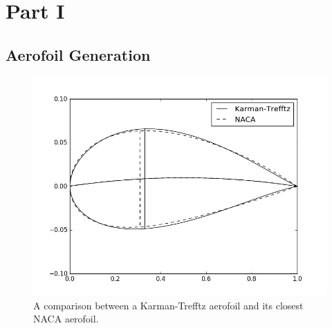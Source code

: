 \documentclass[10pt,a4paper]{article}
\author{Elijah Andrews}
\begin{document}
\section{Part I}
\subsection{Aerofoil Generation}
\begin{figure}[!htb]
\centering
\includegraphics[scale=0.75]{Figures/ktreff_naca_comparison.png}
\caption{A comparison between a Karman-Trefftz aerofoil and its closest NACA aerofoil.}
\label{fig:ktreff_naca_comparison}
\end{figure}
\end{document}

